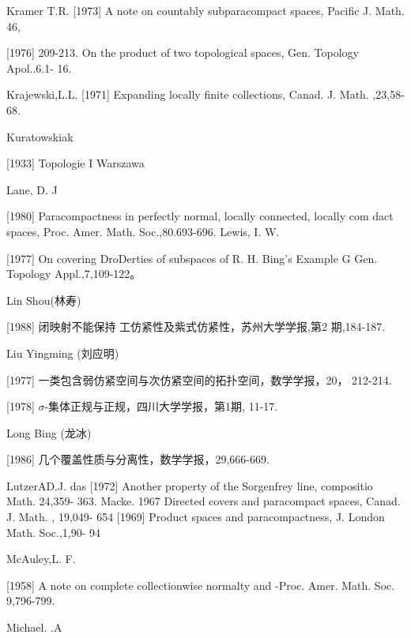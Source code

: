 \documentclass[main.tex]{subfiles}
\begin{document}
Kramer T.R.
[1973]
A note on countably subparacompact spaces, Pacific J. Math. 46,

[1976]
209-213.
On the product of two topological spaces, Gen. Topology Apol..6.1-
16.

Krajewski,L.L.
[1971] Expanding locally finite collections, Canad. J. Math.
,23,58-68.

Kuratowskiak

[1933]
Topologie I Warszawa

Lane, D. J

[1980] Paracompactness in perfectly normal, locally connected, locally com
dact spaces, Proc. Amer. Math. Soc.,80.693-696.
Lewis, I. W.

[1977]
On covering DroDerties of subspaces of R. H. Bing's Example G
Gen. Topology Appl.,7,109-122。

\noindent Lin Shou(林寿)

[1988] 闭映射不能保持 工仿紧性及紫式仿紧性，苏州大学学报,第2
期,184-187.

\noindent Liu Yingming (刘应明)

[1977] 一类包含弱仿紧空间与次仿紧空间的拓扑空间，数学学报，20，
212-214.

[1978] $\sigma$-集体正规与正规，四川大学学报，第1期, 11-17.


\noindent Long Bing (龙冰)

[1986] 几个覆盖性质与分离性，数学学报，29,666-669.

\noindent LutzerAD.J.
das [1972]
Another property of the Sorgenfrey line, compositio Math. 24,359-
363.
Macke.
1967 Directed covers and paracompact spaces, Canad. J. Math. , 19,049-
654
[1969] Product spaces and paracompactness, J. London Math. Soc.,1,90-
94

\noindent McAuley,L. F.

[1958]
A note on complete collectionwise normalty and
-Proc. Amer. Math. Soc. 9,796-799.

\noindent Michael. .A
\end{document}
